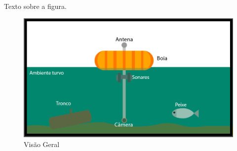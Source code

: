    Texto sobre a figura.
    
\begin{figure}[h]
	\caption{\label{fig:bigpic}Visão Geral}
	\includegraphics[width = 1\textwidth]			{resources/bigpicture}
\end{figure}

